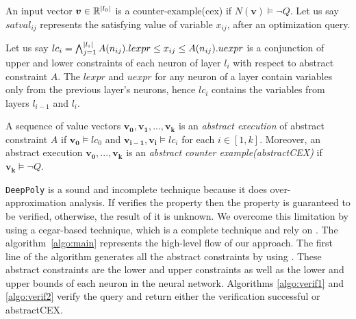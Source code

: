 

An input vector $\boldsymbol{v} \in \mathbb{R}^{|l_0|}$ is a counter-example(cex) if $N(\boldsymbol{v}) \models \lnot Q$. 
Let us say $satval_{ij}$ represents the satisfying value of variable $x_{ij}$, after an optimization query. 







Let us say $lc_i = \bigwedge_{j=1}^{|l_i|} A(n_{ij}).lexpr \leq x_{ij} \leq  A(n_{ij}).uexpr$ is a 
conjunction of upper and lower constraints of each neuron of layer $l_i$ with respect to abstract constraint $A$.
The $lexpr$ and $uexpr$ for any neuron of a layer contain variables only from the previous layer's neurons, 
hence $lc_i$ contains the variables from layers $l_{i-1}$ and $l_i$. 

\begin{df}
  A sequence of value vectors $\boldsymbol{v_0}, \boldsymbol{v_1}, ... , \boldsymbol{v_k}$ is an 
  {\em abstract execution} of abstract constraint $A$ if 
  $\boldsymbol{v_0} \models lc_0$ and $\boldsymbol{v_{i-1}}, \boldsymbol{v_i} \models lc_i$ for each $i \in [1,k]$.  
 Moreover, an abstract execution $\boldsymbol{v_0,...,v_k}$ is
 an {\em abstract counter example(abstractCEX)} if $\boldsymbol{v_k} \models \lnot Q$.
\end{df}



\texttt{DeepPoly} is a sound and incomplete technique because it does over-approximation analysis. 
If \deeppoly{} verifies the property then the property is guaranteed to be verified, otherwise, the result of it is unknown. 
We overcome this limitation by using a cegar-based technique, which is a complete technique and rely on \deeppoly{}. 
The algorithm~\ref{algo:main} represents the high-level flow of our approach.
The first line of the algorithm generates all the abstract constraints by using \deeppoly{}. 
These abstract constraints are the lower and upper constraints as well as the lower and upper bounds 
of each neuron in the neural network. Algorithms \ref{algo:verif1} and \ref{algo:verif2} verify the query 
and return either the verification successful or abstractCEX. 

